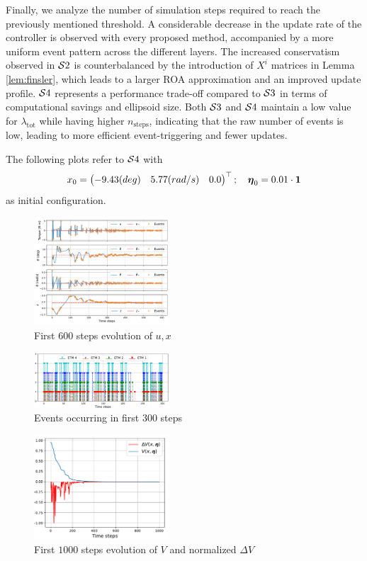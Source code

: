 \documentclass{ifacconf}
\theoremstyle{plain}
\begin{document}
Finally, we analyze the number of simulation steps required to reach the previously mentioned threshold. A considerable decrease in the update rate of the controller is observed with every proposed method, accompanied by a more uniform event pattern across the different layers. The increased conservatism observed in ${\mathcal{S}} 2$ is counterbalanced by the introduction of $X^i$ matrices in Lemma \ref{lem:finsler}, which leads to a larger ROA approximation and an improved update profile. ${\mathcal{S}} 4$ represents a performance trade-off compared to ${\mathcal{S}} 3$ in terms of computational savings and ellipsoid size. Both ${\mathcal{S}} 3$ and ${\mathcal{S}} 4$ maintain a low value for $\lambda_{\text{tot}}$ while having higher $n_{\text{steps}}$, indicating that the raw number of events is low, leading to more efficient event-triggering and fewer updates.

The following plots refer to ${\mathcal{S}} 4$ with $$
x_0 = \left(\begin{matrix}-9.43(deg) & 5.77(rad/s) &  0.0\end{matrix}\right)^\top; \quad \boldsymbol{\eta}_0 = 0.01 \cdot \operatorname{\mathbf{1}}$$ 
as initial configuration.

\begin{figure}[H]
    \centering
    \includegraphics[width=0.45\textwidth]{Figures/evolution_plot}
    \caption{First $600$ steps evolution of $u, x$}
    \label{fig:evolution}
\end{figure}

\begin{figure}[H]
    \centering
    \includegraphics[width=0.45\textwidth]{Figures/event_plot}
    \caption{Events occurring in first $300$ steps}
    \label{fig:events}
\end{figure}

\begin{figure}[H]
    \centering
    \includegraphics[width=0.45\textwidth]{Figures/lyapunov_plot}
    \caption{First $1000$ steps evolution of $V$ and normalized $\Delta V$}
    \label{fig:lyapunov}
\end{figure}
\end{document}
